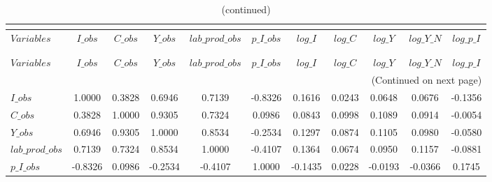  
\begin{center}
\begin{longtable}{lcccccccccc} 
\caption{MATRIX OF CORRELATIONS}\\
 \label{Table:th_corr_matrix}\\
\toprule 
$Variables       $	 & 	 $           I\_obs$	 & 	 $           C\_obs$	 & 	 $           Y\_obs$	 & 	 $  lab\_prod\_obs$	 & 	 $       p\_I\_obs$	 & 	 $           log\_I$	 & 	 $           log\_C$	 & 	 $           log\_Y$	 & 	 $       log\_Y\_N$	 & 	 $       log\_p\_I$\\
\midrule \endfirsthead 
\caption{(continued)}\\
 \toprule \\ 
$Variables       $	 & 	 $           I\_obs$	 & 	 $           C\_obs$	 & 	 $           Y\_obs$	 & 	 $  lab\_prod\_obs$	 & 	 $       p\_I\_obs$	 & 	 $           log\_I$	 & 	 $           log\_C$	 & 	 $           log\_Y$	 & 	 $       log\_Y\_N$	 & 	 $       log\_p\_I$\\
\midrule \endhead 
\midrule \multicolumn{11}{r}{(Continued on next page)} \\ \bottomrule \endfoot 
\bottomrule \endlastfoot 
$I\_obs          $	 & 	            1.0000	 & 	            0.3828	 & 	            0.6946	 & 	            0.7139	 & 	           -0.8326	 & 	            0.1616	 & 	            0.0243	 & 	            0.0648	 & 	            0.0676	 & 	           -0.1356 \\ 
$C\_obs          $	 & 	            0.3828	 & 	            1.0000	 & 	            0.9305	 & 	            0.7324	 & 	            0.0986	 & 	            0.0843	 & 	            0.0998	 & 	            0.1089	 & 	            0.0914	 & 	           -0.0054 \\ 
$Y\_obs          $	 & 	            0.6946	 & 	            0.9305	 & 	            1.0000	 & 	            0.8534	 & 	           -0.2534	 & 	            0.1297	 & 	            0.0874	 & 	            0.1105	 & 	            0.0980	 & 	           -0.0580 \\ 
$lab\_prod\_obs  $	 & 	            0.7139	 & 	            0.7324	 & 	            0.8534	 & 	            1.0000	 & 	           -0.4107	 & 	            0.1364	 & 	            0.0674	 & 	            0.0950	 & 	            0.1157	 & 	           -0.0881 \\ 
$p\_I\_obs       $	 & 	           -0.8326	 & 	            0.0986	 & 	           -0.2534	 & 	           -0.4107	 & 	            1.0000	 & 	           -0.1435	 & 	            0.0228	 & 	           -0.0193	 & 	           -0.0366	 & 	            0.1745 \\ 

\end{longtable}
\end{center}
